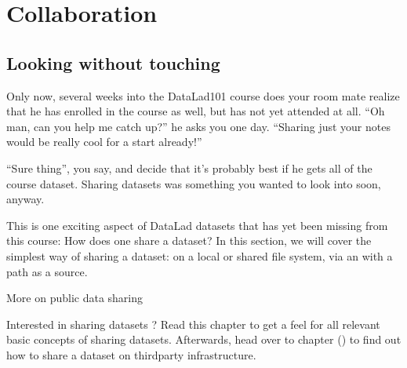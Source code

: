 \chapter{Collaboration}
\label{\detokenize{basics/basics-collaboration:collaboration}}\label{\detokenize{basics/basics-collaboration:chapter-collaboration}}\label{\detokenize{basics/basics-collaboration::doc}}

\sphinxstepscope


\section{Looking without touching}
\label{\detokenize{basics/101-116-sharelocal:looking-without-touching}}\label{\detokenize{basics/101-116-sharelocal:sharelocal1}}\label{\detokenize{basics/101-116-sharelocal::doc}}
\sphinxAtStartPar
Only now, several weeks into the DataLad\sphinxhyphen{}101 course does your room
mate realize that he has enrolled in the course as well, but has not
yet attended at all. “Oh man, can you help me catch up?” he asks
you one day. “Sharing just your notes would be really cool for a
start already!”

\sphinxAtStartPar
“Sure thing”, you say, and decide that it’s probably best if he gets
all of the  course dataset. Sharing datasets was
something you wanted to look into soon, anyway.

\sphinxAtStartPar
This is one exciting aspect of DataLad datasets that has yet been missing
from this course: How does one share a dataset?
In this section, we will cover the simplest way of sharing a dataset:
on a local or shared file system, via an  with a path as
a source.
\begin{importantnote}[before title={\thetcbcounter\ }, check odd page=true]{More on public data sharing}

\sphinxAtStartPar
Interested in sharing datasets ? Read this chapter to get a feel
for all relevant basic concepts of sharing datasets. Afterwards, head over
to chapter {\hyperref[\detokenize{basics/basics-thirdparty:chapter-thirdparty}]{}} () to find out how to share a dataset
on third\sphinxhyphen{}party infrastructure.


\end{importantnote}

